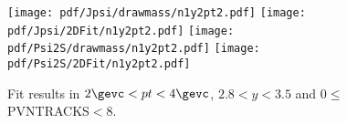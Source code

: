 \begin{figure}[H]
\begin{center}
\texttt{[image: pdf/Jpsi/drawmass/n1y2pt2.pdf]}
\texttt{[image: pdf/Jpsi/2DFit/n1y2pt2.pdf]}
\vspace*{-0.5cm}
\texttt{[image: pdf/Psi2S/drawmass/n1y2pt2.pdf]}
\texttt{[image: pdf/Psi2S/2DFit/n1y2pt2.pdf]}
\vspace*{-0.5cm}
\end{center}
\caption{Fit results in $2\gevc<pt<4\gevc$, $2.8<y<3.5$ and 0$\leq$PVNTRACKS$<$8.}
\label{Fitn1y2pt2}
\end{figure}
